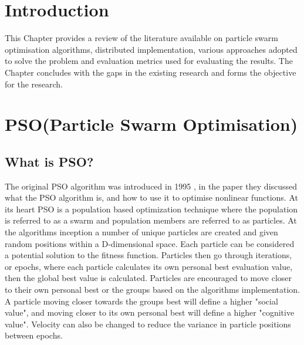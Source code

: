 \documentclass[oneside,12pt]{book}
\begin{document}
\section{Introduction}
This Chapter provides a review of the literature available on particle swarm optimisation algorithms, distributed implementation, various approaches adopted to solve the problem and evaluation metrics used for evaluating the results. The Chapter concludes with the gaps in the existing research and forms the objective for the research.
\section{PSO(Particle Swarm Optimisation)}
\subsection{What is PSO?}
The original PSO algorithm was introduced in 1995 \cite{kennedy1995particle}, in the paper they discussed what the PSO algorithm is, and how to use it to optimise nonlinear functions. At its heart PSO is a population based optimization technique where the population is referred to as a swarm and population members are referred to as particles. At the algorithms inception a number of unique particles are created and given random positions within a D-dimensional space. Each particle can be considered a potential solution to the fitness function. Particles then go through iterations, or epochs, where each particle calculates its own personal best evaluation value, then the global best value is calculated. Particles are encouraged to move closer to their own personal best or the groups based on the algorithms implementation. A particle moving closer towards the groups best will define a higher "social value", and moving closer to its own personal best will define a higher "cognitive value". Velocity can also be changed to reduce the variance in particle positions between epochs.
\end{document}
